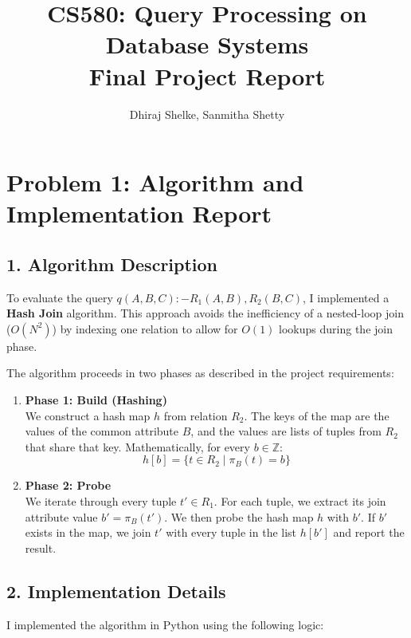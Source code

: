 \documentclass[11pt]{article}
\title{\textbf{CS580: Query Processing on Database Systems}\\ Final Project Report}
\author{Dhiraj Shelke, Sanmitha Shetty}
\begin{document}
\maketitle

\section*{Problem 1: Algorithm and Implementation Report}

\subsection*{1. Algorithm Description}
To evaluate the query $q(A,B,C) :- R_1(A,B), R_2(B,C)$, I implemented a \textbf{Hash Join} algorithm. This approach avoids the inefficiency of a nested-loop join ($O(N^2)$) by indexing one relation to allow for $O(1)$ lookups during the join phase.

The algorithm proceeds in two phases as described in the project requirements:

\begin{enumerate}
    \item \textbf{Phase 1: Build (Hashing)} \\
    We construct a hash map $h$ from relation $R_2$. The keys of the map are the values of the common attribute $B$, and the values are lists of tuples from $R_2$ that share that key. Mathematically, for every $b \in \mathbb{Z}$:
    \[
    h[b] = \{ t \in R_2 \mid \pi_B(t) = b \}
    \]
    
    \item \textbf{Phase 2: Probe} \\
    We iterate through every tuple $t' \in R_1$. For each tuple, we extract its join attribute value $b' = \pi_B(t')$. We then probe the hash map $h$ with $b'$. If $b'$ exists in the map, we join $t'$ with every tuple in the list $h[b']$ and report the result.
\end{enumerate}

\subsection*{2. Implementation Details}
I implemented the algorithm in Python using the following logic:
\end{document}
